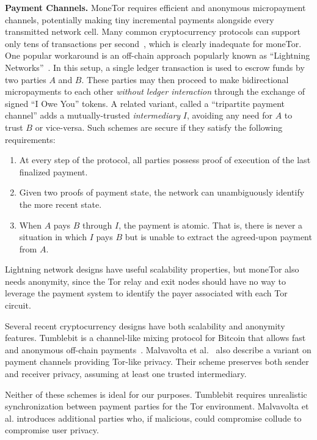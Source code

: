 \medskip \noindent\textbf{Payment Channels.}
MoneTor requires efficient and anonymous micropayment channels, potentially making tiny incremental payments alongside every transmitted network cell.
Many common cryptocurrency protocols can support only tens of transactions per second~\cite{team2018blockchain}, which is clearly inadequate for moneTor.
One popular workaround is an off-chain approach popularly known as ``Lightning Networks''~\cite{poon2016bitcoin}.
In this setup, a single ledger transaction is used to escrow funds by two parties $A$ and $B$.
These parties may then proceed to make bidirectional micropayments to each other \emph{without ledger interaction} through the exchange of signed ``I Owe You'' tokens.
A related variant, called a ``tripartite payment channel'' adds a mutually-trusted {\em intermediary} $I$, avoiding any need for $A$ to trust $B$ or vice-versa.
Such schemes are secure if they satisfy the following requirements:

\begin{enumerate}
\item At every step of the protocol, all parties possess proof of execution of the last finalized payment.
\item Given two proofs of payment state, the network can unambiguously identify the more recent state.
\item When $A$ pays $B$ through $I$, the payment is atomic.
      That is, there is never a situation in which $I$ pays $B$ but is unable to extract the agreed-upon payment from $A$.
\end{enumerate}

Lightning network designs have useful scalability properties, but moneTor also needs anonymity, since the Tor relay and exit nodes should have no way to leverage the payment system to identify the payer associated with each Tor circuit.

Several recent cryptocurrency designs have both scalability and anonymity features.
Tumblebit is a channel-like mixing protocol for Bitcoin that allows fast and anonymous off-chain payments~\cite{heilman2017tumblebit}.
Malvavolta et al.~\cite{malavolta2017concurrency} also describe a variant on payment channels providing Tor-like privacy.
Their scheme preserves both sender and receiver privacy, assuming at least one trusted intermediary.

Neither of these schemes is ideal for our purposes.
Tumblebit requires unrealistic synchronization between payment parties for the Tor environment.
Malvavolta et al. introduces additional parties who, if malicious, could compromise collude to compromise user privacy.


